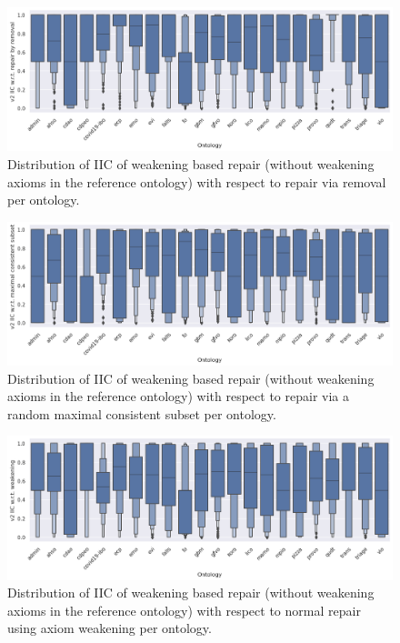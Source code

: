 \begin{figure}[htbp]
  \centering
  \includegraphics[width=\textwidth]{resources/iic-enhance-rem-ontology-violin.png}
  \caption{Distribution of IIC of weakening based repair (without weakening axioms in the reference ontology) with respect to repair via removal per ontology.}
\end{figure}

\begin{figure}[htbp]
  \centering
  \includegraphics[width=\textwidth]{resources/iic-enhance-ontology-violin.png}
  \caption{Distribution of IIC of weakening based repair (without weakening axioms in the reference ontology) with respect to repair via a random maximal consistent subset per ontology.}
\end{figure}

\begin{figure}[htbp]
  \centering
  \includegraphics[width=\textwidth]{resources/iic-enhance-weaken-ontology-violin.png}
  \caption{Distribution of IIC of weakening based repair (without weakening axioms in the reference ontology) with respect to normal repair using axiom weakening per ontology.}
\end{figure}

